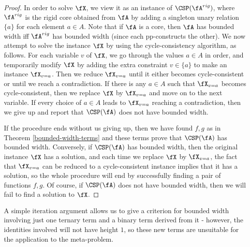 \begin{proof}
In order to solve $\fX$, we view it as an instance of $\CSP(\fA^{rig})$, where $\fA^{rig}$ is the rigid core obtained from $\fA$ by adding a singleton unary relation $\{a\}$ for each element $a \in A$. Note that if $\fA$ is a core, then $\fA$ has bounded width iff $\fA^{rig}$ has bounded width (since each pp-constructs the other). We now attempt to solve the instance $\fX$ by using the cycle-consistency algorithm, as follows. For each variable $v$ of $\fX$, we go through the values $a \in A$ in order, and temporarily modify $\fX$ by adding the extra constraint $v \in \{a\}$ to make an instance $\fX_{v=a}$. Then we reduce $\fX_{v=a}$ until it either becomes cycle-consistent or until we reach a contradiction. If there is any $a \in A$ such that $\fX_{v=a}$ becomes cycle-consistent, then we replace $\fX$ by $\fX_{v=a}$ and move on to the next variable. If every choice of $a \in A$ leads to $\fX_{v=a}$ reaching a contradiction, then we give up and report that $\CSP(\fA)$ does not have bounded width.

If the procedure ends without us giving up, then we have found $f,g$ as in Theorem \ref{bounded-width-terms} and these terms prove that $\CSP(\fA)$ has bounded width. Conversely, if $\CSP(\fA)$ has bounded width, then the original instance $\fX$ has a solution, and each time we replace $\fX$ by $\fX_{v=a}$, the fact that $\fX_{v=a}$ can be reduced to a cycle-consistent instance implies that it has a solution, so the whole procedure will end by successfully finding a pair of functions $f,g$. Of course, if $\CSP(\fA)$ does not have bounded width, then we will fail to find a solution to $\fX$.
\end{proof}


A simple iteration argument allows us to give a criterion for bounded width involving just one ternary term and a binary term derived from it - however, the identities involved will not have height $1$, so these new terms are unsuitable for the application to the meta-problem.

